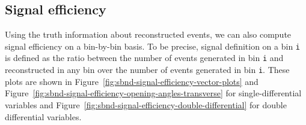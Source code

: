 \documentclass{article}
\begin{document}
\clearpage

\subsection{Signal efficiency}

Using the truth information about reconstructed events, we can also compute signal efficiency on a bin-by-bin basis. 
To be precise, signal definition on a bin \verb|i| is defined as the ratio between the number of events generated in bin \verb|i| 
and reconstructed in any bin over the number of events generated in bin \verb|i|. 
These plots are shown in Figure~\ref{fig:sbnd-signal-efficiency-vector-plots} and 
Figure~\ref{fig:sbnd-signal-efficiency-opening-angles-transverse} for single-differential variables and 
Figure~\ref{fig:sbnd-signal-efficiency-double-differential} for double differential variables.
\end{document}
